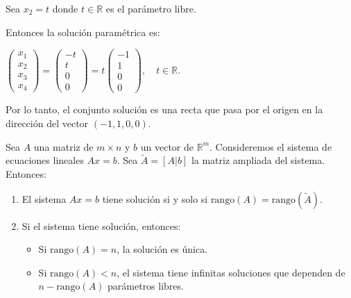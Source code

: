 \begin{example}
\begin{myproof}
Sea $x_2 = t$ donde $t \in \mathbb{R}$ es el parámetro libre. 

Entonces la solución paramétrica es:

$\begin{pmatrix}
x_1 \\ x_2 \\ x_3 \\ x_4
\end{pmatrix} = \begin{pmatrix}
-t \\ t \\ 0 \\ 0
\end{pmatrix} = t\begin{pmatrix}
-1 \\ 1 \\ 0 \\ 0
\end{pmatrix}, \quad t \in \mathbb{R}.$

Por lo tanto, el conjunto solución es una recta que pasa por el origen en la dirección del vector $(-1, 1, 0, 0)$.
\end{myproof}
\end{example}

\begin{theorem}
Sea $A$ una matriz de $m \times n$ y $b$ un vector de $\mathbb{R}^m$. Consideremos el sistema de ecuaciones lineales $Ax = b$. Sea $\tilde{A} = [A|b]$ la matriz ampliada del sistema. Entonces:
\begin{enumerate}
    \item El sistema $Ax = b$ tiene solución si y solo si $\text{rango}(A) = \text{rango}(\tilde{A})$.
    \item Si el sistema tiene solución, entonces:
    \begin{itemize}
        \item Si $\text{rango}(A) = n$, la solución es única.
        \item Si $\text{rango}(A) < n$, el sistema tiene infinitas soluciones que dependen de $n - \text{rango}(A)$ parámetros libres.
    \end{itemize}
\end{enumerate}
\end{theorem}

